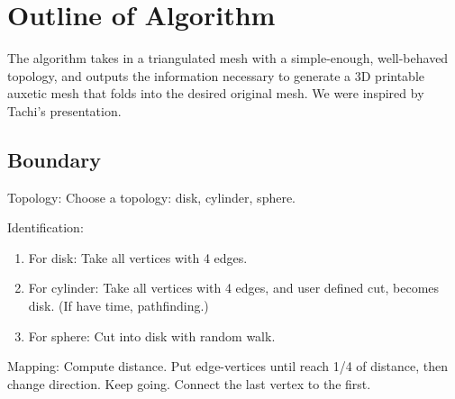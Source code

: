\documentclass{article}
\begin{document}
\pagebreak

\section{Outline of Algorithm}
The algorithm takes in a triangulated mesh with a simple-enough, well-behaved topology, and outputs the information necessary to generate a 3D printable auxetic mesh that folds into the desired original mesh. We were inspired by Tachi's presentation. \cite{tachi}

\subsection{Boundary}
Topology:
Choose a topology: disk, cylinder, sphere.

Identification:
\begin{enumerate}
  \item For disk: Take all vertices with 4 edges.
  \item For cylinder: Take all vertices with 4 edges, and user defined cut, becomes disk. (If have time, pathfinding.)
  \item For sphere: Cut into disk with random walk.
\end{enumerate}

Mapping: Compute distance. Put edge-vertices until reach 1/4 of distance, then change direction. Keep going. Connect the last vertex to the first.
\end{document}
